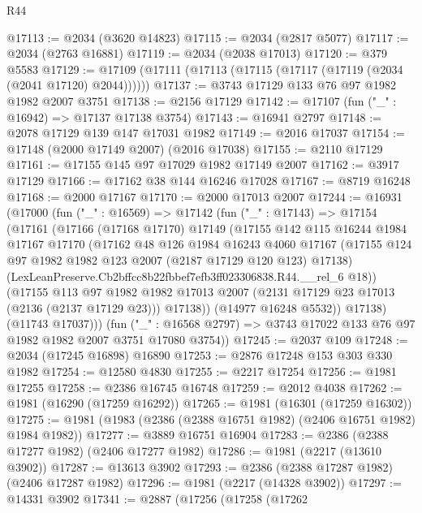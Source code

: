 \begin{lexlean}{R44}
\begin{coremodule}
@17113 := @2034 (@3620 @14823)
@17115 := @2034 (@2817 @5077)
@17117 := @2034 (@2763 @16881)
@17119 := @2034 (@2038 @17013)
@17120 := @379 @5583
@17129 := @17109 (@17111 (@17113 (@17115 (@17117 (@17119 (@2034 (@2041 @17120) @2044))))))
@17137 := @3743 @17129 @133 @76 @97 @1982 @1982 @2007 @3751
@17138 := @2156 @17129
@17142 := @17107 (fun ("_" : @16942) => @17137 @17138 @3754)
@17143 := @16941 @2797
@17148 := @2078 @17129 @139 @147 @17031 @1982
@17149 := @2016 @17037
@17154 := @17148 (@2000 @17149 @2007) (@2016 @17038)
@17155 := @2110 @17129
@17161 := @17155 @145 @97 @17029 @1982 @17149 @2007
@17162 := @3917 @17129
@17166 := @17162 @38 @144 @16246 @17028
@17167 := @8719 @16248
@17168 := @2000 @17167
@17170 := @2000 @17013 @2007
@17244 := @16931
    (@17000
      (fun ("_" : @16569) =>
      @17142
        (fun ("_" : @17143) =>
        @17154
          (@17161
            (@17166
              (@17168 @17170)
              @17149
              (@17155
                @142
                @115
                @16244
                @1984
                @17167
                @17170
                (@17162
                  @48
                  @126
                  @1984
                  @16243
                  @4060
                  @17167
                  (@17155 @124 @97 @1982 @1982 @123 @2007 (@2187 @17129 @120 @123) @17138)
                  (LexLeanPreserve.Cb2bffcc8b22fbbef7efb3ff023306838.R44.__rel_6 @18))
                (@17155
                  @113
                  @97
                  @1982
                  @1982
                  @17013
                  @2007
                  (@2131 @17129 @23 @17013 (@2136 (@2137 @17129 @23)))
                  @17138))
              (@14977 @16248 @5532))
            @17138)
          (@11743 @17037)))
      (fun ("_" : @16568 @2797) => @3743 @17022 @133 @76 @97 @1982 @1982 @2007 @3751 @17080 @3754))
@17245 := @2037 @109
@17248 := @2034 (@17245 @16898) @16890
@17253 := @2876 @17248 @153 @303 @330 @1982
@17254 := @12580 @4830
@17255 := @2217 @17254
@17256 := @1981 @17255
@17258 := @2386 @16745 @16748
@17259 := @2012 @4038
@17262 := @1981 (@16290 (@17259 @16292))
@17265 := @1981 (@16301 (@17259 @16302))
@17275 := @1981 (@1983 (@2386 (@2388 @16751 @1982) (@2406 @16751 @1982) @1984 @1982))
@17277 := @3889 @16751 @16904
@17283 := @2386 (@2388 @17277 @1982) (@2406 @17277 @1982)
@17286 := @1981 (@2217 (@13610 @3902))
@17287 := @13613 @3902
@17293 := @2386 (@2388 @17287 @1982) (@2406 @17287 @1982)
@17296 := @1981 (@2217 (@14328 @3902))
@17297 := @14331 @3902
@17341 := @2887
    (@17256
      (@17258
        (@17262

\end{coremodule}
\end{lexlean}
